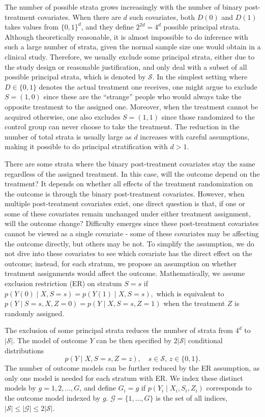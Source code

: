 \documentclass{article}
\begin{document}
The number of possible strata grows increasingly with the number of binary post-treatment covariates. When there are $d$ such covariates, both $D(0)$ and $D(1)$ takes values from $\{0, 1\}^{d}$, and they define $2^{2d} = 4^d$ possible principal strata. Although theoretically reasonable, it is almost impossible to do inference with such a large number of strata, given the normal sample size one would obtain in a clinical study. Therefore, we usually exclude some principal strata, either due to the study design or reasonable justification, and only deal with a subset of all possible principal strata, which is denoted by $\mathcal{S}$. In the simplest setting where $D\in \{0, 1\}$ denotes the actual treatment one receives, one might argue to exclude $S = (1, 0)$ since these are the ``strange'' people who would always take the opposite treatment to the assigned one. Moreover, when the treatment cannot be acquired otherwise, one also excludes $S = (1, 1)$ since those randomized to the control group can never choose to take the treatment. The reduction in the number of total strata is usually large as $d$ increases with careful assumptions, making it possible to do principal stratification with $d > 1$.

There are some strata where the binary post-treatment covariates stay the same regardless of the assigned treatment. In this case, will the outcome depend on the treatment? It depends on whether all effects of the treatment randomization on the outcome is through the binary post-treatment covariates. However, when multiple  post-treatment covariates exist, one direct question is that, if one or some of these covariates remain unchanged under either treatment assignment, will the outcome change? Difficulty emerges since these post-treatment covariates cannot be viewed as a single covariate - some of these covariates may be affecting the outcome directly, but others may be not. To simplify the assumption, we do not dive into these covariates to see which covariate has the direct effect on the outcome; instead, for each stratum, we propose an assumption on whether treatment assignments would affect the outcome. Mathematically, we assume exclusion restriction (ER) on stratum $S=s$ if $p(Y(0)\mid X, S=s) = p(Y(1) \mid X, S = s),$ which is equivalent to $p(Y\mid S = s, X, Z = 0) = p(Y \mid X, S = s, Z = 1)$ when the treatment $Z$ is randomly assigned.

The exclusion of some principal strata reduces the number of strata from $4^d$ to $|\mathcal{S}|$. The model of outcome $Y$ can be then specified by $2|\mathcal{S}|$ conditional distributions $$p(Y \mid X, S = s, Z = z), \quad s\in\mathcal{S}, \,z\in\{0, 1\}.$$ The number of outcome models can be further reduced by the ER assumption, as only one model is needed for each stratum with ER. We index these distinct models by $g = 1, 2, \dots, G$, and define $G_i = g$ if $p(Y_i\mid X_i, S_i, Z_i)$ corresponds to the outcome model indexed by $g$. $\mathcal{G} = \{1,\dots, G\}$ is the set of all indices, $|\mathcal{S}|\leq |\mathcal{G}| \leq 2|\mathcal{S}|$.
\end{document}
